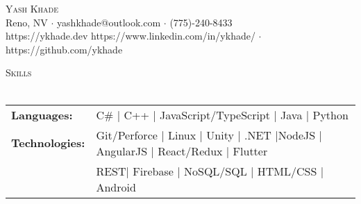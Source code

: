 \documentclass[a4paper]{article}
\newcommand{\lineunder} {
    \vspace*{-8pt} \\
    \hspace*{-18pt} \hrulefill \\
}
\newcommand{\header} [1] {
    {\hspace*{-18pt}\vspace*{6pt} \textsc{#1}}
    \vspace*{-6pt} \lineunder
}
\begin{document}
\vspace*{-40pt}

    

\vspace*{-10pt}
\begin{center}
	{\Huge \scshape {Yash Khade}}\\
	Reno, NV $\cdot$ yashkhade@outlook.com $\cdot$ (775)-240-8433 \\ https://ykhade.dev https://www.linkedin.com/in/ykhade/ $\cdot$ https://github.com/ykhade
\end{center}

\header{Skills}
\begin{tabular}{ l l }
	\textbf{Languages:}    & C\#  | C++ | JavaScript/TypeScript | Java | Python   \\
	
	\textbf{Technologies:} & Git/Perforce | Linux | Unity | .NET |NodeJS | AngularJS | React/Redux | Flutter \\& REST| Firebase | NoSQL/SQL | HTML/CSS | Android \\
\end{tabular}
\vspace{2mm}
\end{document}
